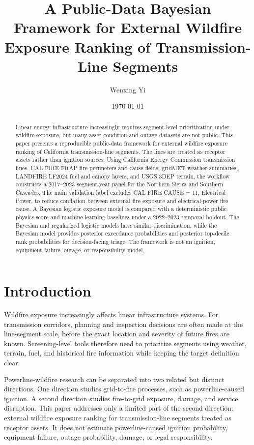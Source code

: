 \documentclass[11pt]{article}
\title{A Public-Data Bayesian Framework for External Wildfire Exposure Ranking of Transmission-Line Segments}
\author{Wenxing Yi}
\date{\today}
\begin{document}
\maketitle

\begin{abstract}
Linear energy infrastructure increasingly requires segment-level prioritization
under wildfire exposure, but many asset-condition and outage datasets are not
public. This paper presents a reproducible public-data framework for external
wildfire exposure ranking of California transmission-line segments. The lines
are treated as receptor assets rather than ignition sources. Using California
Energy Commission transmission lines, CAL FIRE FRAP fire perimeters and cause
fields, gridMET weather summaries, LANDFIRE LF2024 fuel and canopy layers, and
USGS 3DEP terrain, the workflow constructs a 2017--2023 segment-year panel for
the Northern Sierra and Southern Cascades. The main validation label excludes
CAL FIRE CAUSE = 11, Electrical Power, to reduce conflation between external
fire exposure and electrical-power fire cause. A Bayesian logistic exposure
model is compared with a deterministic public physics score and machine-learning
baselines under a 2022--2023 temporal holdout. The Bayesian and regularized
logistic models have similar discrimination, while the Bayesian model provides
posterior exceedance probabilities and posterior top-decile rank probabilities
for decision-facing triage. The framework is not an ignition, equipment-failure,
outage, or responsibility model.
\end{abstract}

\section{Introduction}

Wildfire exposure increasingly affects linear infrastructure systems. For
transmission corridors, planning and inspection decisions are often made at the
line-segment scale, before the exact location and severity of future fires are
known. Screening-level tools therefore need to prioritize segments using
weather, terrain, fuel, and historical fire information while keeping the target
definition clear.

Powerline-wildfire research can be separated into two related but distinct
directions. One direction studies grid-to-fire processes, such as
powerline-caused ignition. A second direction studies fire-to-grid exposure,
damage, and service disruption. This paper addresses only a limited part of the
second direction: external wildfire exposure ranking for transmission-line
segments treated as receptor assets. It does not estimate powerline-caused
ignition probability, equipment failure, outage probability, damage, or legal
responsibility.
\end{document}
